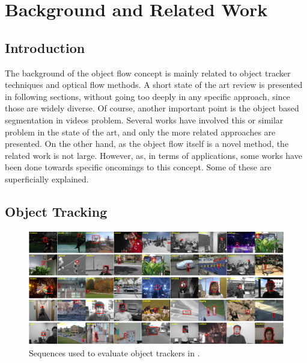\chapter{Background and Related Work} \label{chap:background}

\section{Introduction}

The background of the object flow concept is mainly related to object tracker techniques and optical flow methods. A short state of the art review is presented in 
following sections, without going too deeply in any specific approach, since those are widely diverse. Of course, another important point is the object based segmentation in videos problem. Several works have involved this or similar problem in 
the state of the art, and only the more related approaches are presented. On the other hand, as the object flow itself is a novel method, the related work is not large.
 However, as, in terms of applications, some works have been done towards specific oncomings to this concept. Some of these are superficially explained.

\section{Object Tracking}

   \begin{figure}[thpb]
      \centering
      \includegraphics[width=1.0\textwidth]{../images/tr_db.png}
      \caption{Sequences used to evaluate object trackers in \cite{c16}. }
      \label{tr_db}
   \end{figure}

